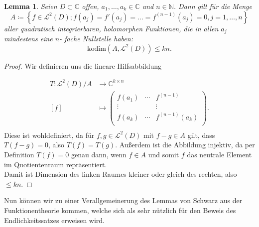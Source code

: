 \documentclass[11pt,a4paper,toc=bibliography]{scrartcl}
\theoremstyle{def}
\theoremstyle{thm}
\newtheorem{lemma}[defi]{Lemma}
\theoremstyle{remark}
\begin{document}
\begin{lemma}
Seien $D\subset\mathbb{C}$ offen, $a_1,\ldots,a_k\in\mathbb{C}$ und $n\in\mathbb{N}$. Dann gilt für die Menge \[A\coloneqq \left\{ f\in \mathcal{L}^2(D); f(a_j)=f'(a_j)=\ldots=f^{(n-1)}(a_j)= 0,  j=1,\ldots,n\right\}\]
aller quadratisch integrierbaren, holomorphen Funktionen, die in allen $a_j$ mindestens eine $n$- fache Nullstelle haben:
\[ \mathrm{kodim}(A,\mathcal{L}^2(D))\leq kn.
\]
\end{lemma}
\newpage
\begin{proof}
Wir definieren uns die lineare Hilfsabbildung

\begin{align*}
T:\mathcal{L}^2(D)/A 	&\longrightarrow 	\mathbb{C}^{k\times n}\\
  [f] 					&\longmapsto 			     \begin{pmatrix}
  													f(a_1) &\cdots & f^{(n-1)}\\
  													\vdots & &\vdots\\
  													f(a_k) &\cdots & f^{(n-1)}(a_k)\\
													\end{pmatrix}. \\
\end{align*} 
Diese ist wohldefiniert, da für $f,g\in \mathcal{L}^2(D)$ mit $f-g\in A$ gilt, dass $T(f-g)=0$, also $T(f)=T(g)$. Außerdem ist die Abbildung injektiv, da per Definition $T(f)=0$ genau dann, wenn $f\in A$ und somit $f$ das neutrale Element im Quotientenraum repräsentiert.
\\ Damit ist Dimension des linken Raumes kleiner oder gleich des rechten, also $\leq kn$.
\end{proof}

Nun können wir zu einer Verallgemeinerung des Lemmas von Schwarz aus der Funktionentheorie kommen, welche sich als sehr nützlich für den Beweis des Endlichkeitssatzes erweisen wird.
\end{document}
